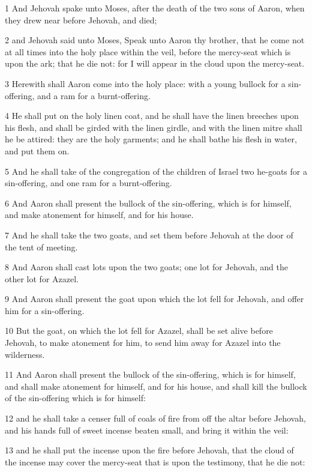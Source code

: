 \par 1 And Jehovah spake unto Moses, after the death of the two sons of Aaron, when they drew near before Jehovah, and died;
\par 2 and Jehovah said unto Moses, Speak unto Aaron thy brother, that he come not at all times into the holy place within the veil, before the mercy-seat which is upon the ark; that he die not: for I will appear in the cloud upon the mercy-seat.
\par 3 Herewith shall Aaron come into the holy place: with a young bullock for a sin-offering, and a ram for a burnt-offering.
\par 4 He shall put on the holy linen coat, and he shall have the linen breeches upon his flesh, and shall be girded with the linen girdle, and with the linen mitre shall he be attired: they are the holy garments; and he shall bathe his flesh in water, and put them on.
\par 5 And he shall take of the congregation of the children of Israel two he-goats for a sin-offering, and one ram for a burnt-offering.
\par 6 And Aaron shall present the bullock of the sin-offering, which is for himself, and make atonement for himself, and for his house.
\par 7 And he shall take the two goats, and set them before Jehovah at the door of the tent of meeting.
\par 8 And Aaron shall cast lots upon the two goats; one lot for Jehovah, and the other lot for Azazel.
\par 9 And Aaron shall present the goat upon which the lot fell for Jehovah, and offer him for a sin-offering.
\par 10 But the goat, on which the lot fell for Azazel, shall be set alive before Jehovah, to make atonement for him, to send him away for Azazel into the wilderness.
\par 11 And Aaron shall present the bullock of the sin-offering, which is for himself, and shall make atonement for himself, and for his house, and shall kill the bullock of the sin-offering which is for himself:
\par 12 and he shall take a censer full of coals of fire from off the altar before Jehovah, and his hands full of sweet incense beaten small, and bring it within the veil:
\par 13 and he shall put the incense upon the fire before Jehovah, that the cloud of the incense may cover the mercy-seat that is upon the testimony, that he die not:
